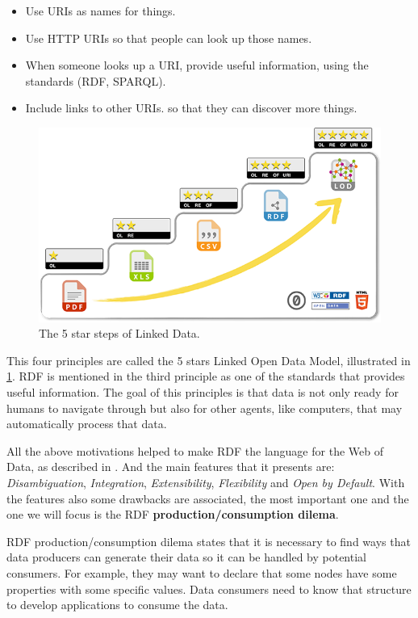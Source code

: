 \begin{itemize}
  \item Use URIs as names for things.
  \item Use HTTP URIs so that people can look up those names.
  \item When someone looks up a URI, provide useful information, using the standards (RDF, SPARQL).
  \item Include links to other URIs. so that they can discover more things.
\end{itemize}

\begin{figure}
    \includegraphics[scale=0.25]{images/5-star-steps.png}
    \centering
	\caption[The 5 star steps of Linked Data]{The 5 star steps of Linked Data.}
	\label{fig:margin-5-star-steps}
\end{figure}

This four principles are called the 5 stars Linked Open Data Model, illustrated in \cref{fig:margin-5-star-steps}.
RDF is mentioned in the third principle as one of the standards that provides useful information. The goal of this
principles is that data is not only ready for humans to navigate through but also for other agents, like computers,
that may automatically process that data.

All the above motivations helped to make RDF the language for the Web of Data, as described in \cite{labra-validating-rdf}.
And the main features that it presents are: \textit{Disambiguation}, \textit{Integration}, \textit{Extensibility}, \textit{Flexibility} and \textit{Open by Default}.
With the features also some drawbacks are associated, the most important one and the one we will focus is the RDF
\textbf{production/consumption dilema}.

RDF production/consumption dilema states that it is necessary to find ways that data producers can generate their data so
it can be handled by potential consumers. For example, they may want to declare that some nodes have some properties with
some specific values. Data consumers need to know that structure to develop applications to consume the data.

